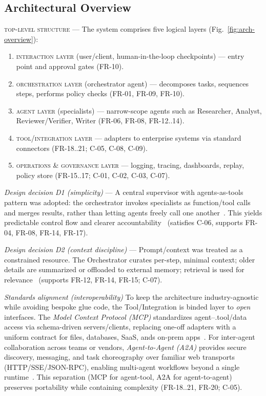 \subsection{Architectural Overview}\label{sec:arch-overview}

\textsc{top-level structure} --- The system comprises five logical layers (Fig.~\ref{fig:arch-overview}):
\begin{enumerate}
  \item \textsc{interaction layer} (user/client, human-in-the-loop checkpoints) --- entry point and approval gates (\textsc{FR-10}).
  \item \textsc{orchestration layer} (orchestrator agent) --- decomposes tasks, sequences steps, performs policy checks (\textsc{FR-01, FR-09, FR-10}).
  \item \textsc{agent layer} (specialists) --- narrow-scope agents such as Researcher, Analyst, Reviewer/Verifier, Writer (\textsc{FR-06, FR-08, FR-12..14}).
  \item \textsc{tool/integration layer} --- adapters to enterprise systems via standard connectors (\textsc{FR-18..21; C-05, C-08, C-09}).
  \item \textsc{operations \& governance layer} --- logging, tracing, dashboards, replay, policy store (\textsc{FR-15..17; C-01, C-02, C-03, C-07}).
\end{enumerate}

\noindent \textit{Design decision D1 (simplicity)} ---  A central supervisor with agents-as-tools pattern was adopted: the orchestrator invokes specialists as function/tool calls and merges results, rather than letting agents freely call one another~\parencite{langchain_multi_agents}. This yields predictable control flow and clearer accountability~\parencite{cognition_dont_build} (satisfies \textsc{C-06}, supports \textsc{FR-04, FR-08, FR-14, FR-17}).

\noindent \textit{Design decision D2 (context discipline)} --- Prompt/context was treated as a constrained resource. The Orchestrator curates per-step, minimal context; older details are summarized or offloaded to external memory; retrieval is used for relevance~\parencite{breunig_context_fail,breunig_fix_context} (supports \textsc{FR-12, FR-14, FR-15; C-07}).

\noindent \textit{Standards alignment (interoperability)} To keep the architecture industry-agnostic while avoiding bespoke glue code, the Tool/Integration is binded layer to \emph{open} interfaces. The \emph{Model Context Protocol (MCP)} standardizes agent--.tool/data access via schema-driven servers/clients, replacing one-off adapters with a uniform contract for files, databases, SaaS, ands on-prem apps~\parencite{anthropic_mcp}. For inter-agent collaboration across teams or vendors, \emph{Agent-to-Agent (A2A)} provides secure discovery, messaging, and task choreography over familiar web transports (HTTP/SSE/JSON-RPC), enabling multi-agent workflows beyond a single runtime~\parencite{google_a2a}. This separation (MCP for agent-tool, A2A for agent-to-agent) preserves portability while containing complexity (\textsc{FR-18..21, FR-20; C-05}).



